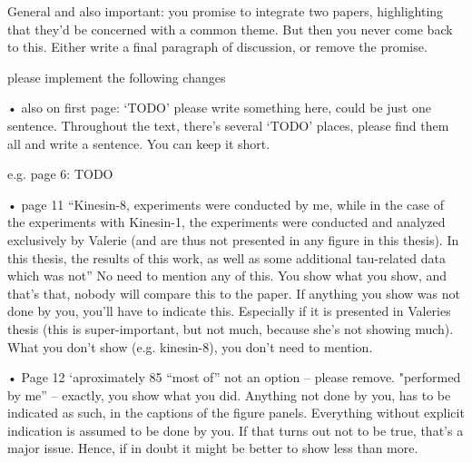 General and also important: you promise to integrate two papers, highlighting that they’d be concerned with a common theme. But then you never come back to this. Either write a final paragraph of discussion, or remove the promise. 


please implement the following changes





• also on first page: ‘TODO’ please write something here, could be just one sentence. Throughout the text, there’s several ‘TODO’ places, please find them all and write a sentence. You can keep it short. 

e.g. page 6: TODO

• page 11 “Kinesin-8, experiments were conducted by me, while in the case of the experiments with Kinesin-1, the experiments were conducted and analyzed exclusively by Valerie (and are thus not presented in any figure in this thesis). In this thesis, the results of this work, as well as some additional tau-related data which was not” 
	No need to mention any of this. You show what you show, and that’s that, nobody will compare this to the paper.  If anything you show was not done by you, you’ll have to indicate this. Especially if it is presented in Valeries thesis (this is super-important, but not much, because she’s not showing much). What you don’t show (e.g. kinesin-8), you don’t need to mention.


• Page 12 ‘aproximately 85%
	“most of” not an option – please remove. "performed by me” – exactly, you show what you did. Anything not done by you, has to be indicated as such, in the captions of the figure panels. Everything without explicit indication is assumed to be done by you. If that turns out not to be true, that’s a major issue. Hence, if in doubt it might be better to show less than more. 

